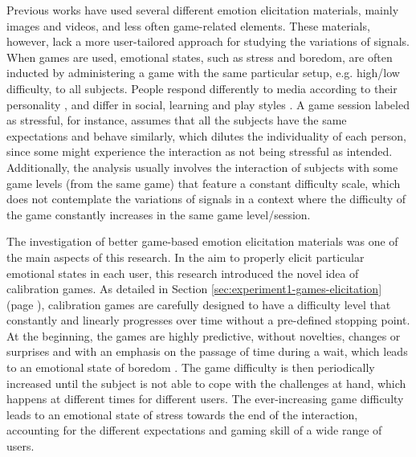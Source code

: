 
Previous works have used several different emotion elicitation materials, mainly images and videos, and less often game-related elements. These materials, however, lack a more user-tailored approach for studying the variations of signals. When games are used, emotional states, such as stress and boredom, are often inducted by administering a game with the same particular setup, e.g. high/low difficulty, to all subjects. People respond differently to media according to their personality \parencite{ravaja2004effects}, and differ in social, learning and play styles \parencite{goldberg1993structure}. A game session labeled as stressful, for instance, assumes that all the subjects have the same expectations and behave similarly, which dilutes the individuality of each person, since some might experience the interaction as not being stressful as intended. Additionally, the analysis usually involves the interaction of subjects with some game levels (from the same game) that feature a constant difficulty scale, which does not contemplate the variations of signals in a context where the difficulty of the game constantly increases in the same game level/session.

The investigation of better game-based emotion elicitation materials was one of the main aspects of this research. In the aim to properly elicit particular emotional states in each user, this research introduced the novel idea of calibration games. As detailed in Section \ref{sec:experiment1-games-elicitation} (page \pageref{sec:experiment1-games-elicitation}), calibration games are carefully designed to have a difficulty level that constantly and linearly progresses over time without a pre-defined stopping point. At the beginning, the games are highly predictive, without novelties, changes or surprises and with an emphasis on the passage of time during a wait, which leads to an emotional state of boredom \parencite{van2010behave,koster2013theory,schell2014art}. The game difficulty is then periodically increased until the subject is not able to cope with the challenges at hand, which happens at different times for different users. The ever-increasing game difficulty leads to an emotional state of stress towards the end of the interaction, accounting for the different expectations and gaming skill of a wide range of users.

